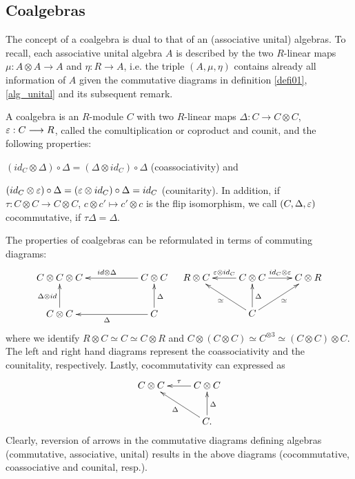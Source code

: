 \subsection{Coalgebras}
The concept of a coalgebra is dual to that of an (associative unital) algebras. To recall, each associative unital algebra $A$ is described by the two $R$-linear maps $\mu : A \otimes A \longrightarrow A$ and $\eta : R \longrightarrow A$, i.e. the triple $(A,\mu,\eta)$ contains already all information of $A$ given the commutative diagrams in definition \ref{defi01}, \ref{alg_unital} and its subsequent remark.
\begin{defi}\label{defi08}
A coalgebra is an $R$-module $C$ with two $R$-linear maps $\Delta : C \longrightarrow C \otimes C$, $\varepsilon : C \longrightarrow R$, called the comultiplication or coproduct and counit, and the following properties:
\bn
\item $(id_C \otimes \Delta) \circ \Delta = (\Delta \otimes id_C) \circ \Delta$ (coassociativity) and
\item $(id_C \otimes \varepsilon) \circ \Delta = (\varepsilon \otimes id_C) \circ \Delta = id_C$ (counitarity).
\en
In addition, if $\tau : C \otimes C \longrightarrow C\otimes C$, $c \otimes c' \longmapsto c' \otimes c$ is the flip isomorphism, we call $(C, \Delta, \varepsilon)$ cocommutative, if $\tau \Delta = \Delta$.
\end{defi}
\bmk The properties of coalgebras can be reformulated in terms of commuting diagrams:
$$\bao{cc}
\xymatrix{
C \otimes C \otimes C && C \otimes C\ar[ll]_{id \otimes \Delta}\\
C\otimes C \ar[u]^{\Delta \otimes id}&& C\ar[ll]^{\Delta}\ar[u]_{\Delta}\\
} & \xymatrix{R \otimes C & \ar[l]_{\eps \otimes id_C} C \otimes C \ar[r]^{id_C \otimes \eps}& C \otimes R\\
&C \ar[lu]^\simeq \ar[u]_\Delta \ar[ru]_\simeq&\\
}\ea$$
where we identify $R \otimes C \simeq C \simeq C \otimes R$ and $C \otimes (C \otimes C) \simeq C^{\otimes 3} \simeq (C \otimes C) \otimes C$. The left and right hand diagrams represent the coassociativity and the counitality, respectively. Lastly, cocommutativity can expressed as
$$\xymatrix{
C \otimes C & C \otimes C\ar[l]_\tau\\
&C \ar[lu]^\Delta\ar[u]_\Delta.\\
}$$
Clearly, reversion of arrows in the commutative diagrams defining algebras (commutative, associative, unital) results in the above diagrams (cocommutative, coassociative and counital, resp.).
